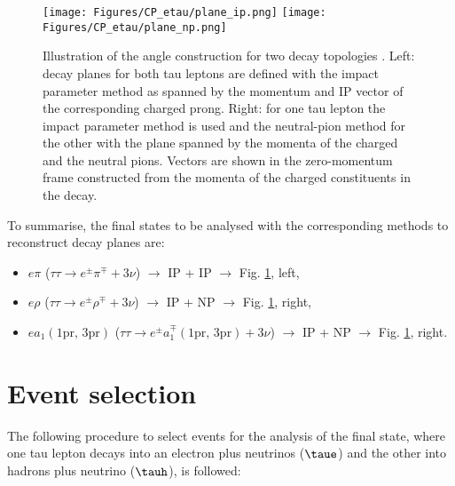 \begin{figure}[t!]
    \centering
    \texttt{[image: Figures/CP\_etau/plane\_ip.png]}
    \texttt{[image: Figures/CP\_etau/plane\_np.png]}
    \caption{Illustration of the \phicp angle construction for two decay topologies \cite{CMS:2021sdq}. Left: decay planes for both tau leptons are defined with the impact parameter method as spanned by the momentum and IP vector of the corresponding charged prong. Right: for one tau lepton the impact parameter method is used and the neutral-pion method for the other with the plane spanned by the momenta of the charged and the neutral pions. Vectors are shown in the zero-momentum frame constructed from the momenta of the charged constituents in the \htt decay.}
    \label{fig:planes}
\end{figure}

To summarise, the final states to be analysed with the corresponding methods to reconstruct decay planes are:
\begin{itemize}
    \item $e\pi$ ($\tau\tau \to e^\pm \pi^\mp + 3\nu$) $\longrightarrow$ IP + IP $\longrightarrow$ Fig. \ref{fig:planes}, left,
    \item $e\rho$ ($\tau\tau \to e^\pm \rho^\mp + 3\nu$) $\longrightarrow$ IP + NP $\longrightarrow$ Fig. \ref{fig:planes}, right,
    \item $e a_1(\text{1pr, 3pr})$ ($\tau\tau \to e^\pm a_1^\mp(\text{1pr, 3pr}) + 3\nu$) $\longrightarrow$ IP + NP $\longrightarrow$ Fig. \ref{fig:planes}, right.
\end{itemize}

\section{Event selection}\label{sec:selection}
The following procedure to select events for the analysis of the \et final state, where one tau lepton decays into an electron plus neutrinos ($\taue$) and the other into hadrons plus neutrino ($\tauh$), is followed:

